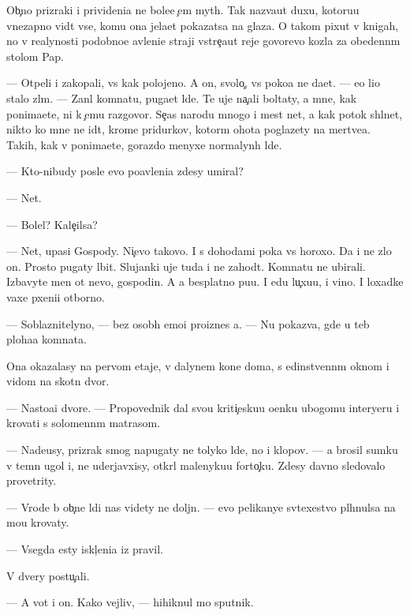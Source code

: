 \documentclass[10pt]{book}
\begin{document}
Ob{\yi}{\c}no prizraki i privideni{\y}a ne bole{\y}e {\c}em myth. Tak naz{\yi}va{\y}ut duxu, kotoru{\y}u vnezapno vid{\ia}t vse, komu ona jela{\y}et pokazatsa na glaza. O takom pixut v knigah, no v realynosti podobno{\y}e {\y}avleni{\y}e straji vstre{\c}a{\y}ut reje govor{\ia}{\x}evo kozla za obedenn{\yi}m stolom Pap{\yi}.

— Otpeli i zakopali, vs{\e} kak polojeno. A on, svolo{\c}, vs{\e} poko{\y}a ne da{\y}et. — {\y}e{\y}o li{\q}o stalo zl{\yi}m. — Zan{\ia}l komnatu, puga{\y}et l{\iu}de{\y}. Te uje na{\c}ali boltaty, a mne, kak ponima{\y}ete, ni k {\c}emu razgovor{\yi}. Se{\y}{\c}as narodu mnogo i mest net, a kak potok shl{\yi}net, nikto ko mne ne id{\e}t, krome pridurkov, kotor{\yi}m ohota poglazety na mertve{\q}a. Takih, kak v{\yi} ponima{\y}ete, gorazdo menyxe normalyn{\yi}h l{\iu}de{\y}.

— Kto-nibudy posle {\y}evo po{\y}avleni{\y}a zdesy umiral?

— Net.

— Bolel? Kale{\c}ilsa?

— Net, upasi Gospody. Ni{\c}evo takovo. I s dohodami poka vs{\e} horoxo. Da i ne zlo{\y} on. Prosto pugaty l{\iu}bit. Slujanki uje tuda i ne zahod{\ia}t. Komnatu ne ubirali. Izbavyte men{\ia} ot nevo, gospodin. A {\y}a besplatno pu{\x}u. I {\y}edu lu{\c}xu{\y}u, i vino. I loxadke vaxe{\y} pxeni{\q}i otborno{\y}.

— Soblaznitelyno, — bez osob{\yi}h emo{\q}i{\y} pro{\y}iznes {\y}a. — Nu pokaz{\yi}va{\y}, gde u teb{\ia} ploha{\y}a komnata.

Ona okazalasy na pervom etaje, v dalynem kon{\q}e doma, s {\y}edinstvenn{\yi}m oknom i vidom na skotn{\yi}{\y} dvor.

— Nasto{\y}a{\x}i{\y} dvore{\q}. — Propovednik dal svo{\y}u kriti{\c}esku{\y}u o{\q}enku ubogomu interyeru i krovati s solomenn{\yi}m matrasom.

— Nade{\y}usy, prizrak smog napugaty ne tolyko l{\iu}de{\y}, no i klopov. — {\Y}a brosil sumku v temn{\yi}{\y} ugol i, ne uderjavxisy, otkr{\yi}l malenyku{\y}u forto{\c}ku. Zdesy davno sledovalo provetrity.

— Vrode b{\yi} ob{\yi}{\c}n{\yi}{\y}e l{\iu}di nas videty ne doljn{\yi}. — {\Y}evo pelikanye sv{\ia}te{\y}xestvo pl{\iu}hnulsa na mo{\y}u krovaty.

— Vsegda {\y}esty iskl{\iu}{\c}eni{\y}a iz pravil.

V dvery postu{\c}ali.

— A vot i on. Kako{\y} vejliv{\yi}{\y}, — hihiknul mo{\y} sputnik.
\end{document}
